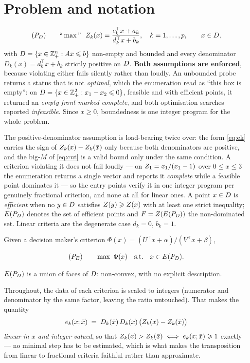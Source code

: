 \documentclass[11pt,a4paper]{article}
\begin{document}
\section{Problem and notation}

\begin{equation}
(P_{D}) \qquad
\text{``}\max\text{''} \ \ Z_k(x) = \frac{c_k^{\top}x + a_k}{d_k^{\top}x + b_k},
\quad k = 1,\dots,p, \qquad x \in D ,
\end{equation}
with $D = \{x \in \mathbb{Z}^{n}_{+} : Ax \leqslant b\}$ non-empty and bounded
and every denominator $D_k(x) = d_k^{\top}x + b_k$ strictly positive on
$D$.  \textbf{Both assumptions are enforced}, because violating either
fails silently rather than loudly.  An unbounded probe returns a status that
is not \emph{optimal}, which the enumeration read as ``this box is empty'':
on $D = \{x \in \mathbb{Z}^{2}_{+} : x_1 - x_2 \leqslant 0\}$, feasible and with
efficient points, it returned an \emph{empty front marked complete}, and both
optimisation searches reported \emph{infeasible}.  Since $x \geqslant 0$,
boundedness is one integer program for the whole problem.

The positive-denominator assumption is load-bearing twice over: the form \eqref{eq:ek} carries the sign of
$Z_k(x) - Z_k(\bar x)$ only because both denominators are positive, and the
big-$M$ of \eqref{eq:cut} is a valid bound only under the same condition.  A
criterion violating it does not fail loudly --- on $Z_1 = x_1/(x_1-1)$ over
$0 \leqslant x \leqslant 3$ the enumeration returns a single vector and reports
it \emph{complete} while a feasible point dominates it --- so the entry points
verify it in one integer program per genuinely fractional criterion, and none
at all for linear ones.  A point $x \in D$ is \emph{efficient} when no $y \in D$
satisfies $Z(y) \geqslant Z(x)$ with at least one strict inequality; $E(P_{D})$
denotes the set of efficient points and $F = Z(E(P_{D}))$ the non-dominated set.
Linear criteria are the degenerate case $d_k = 0$, $b_k = 1$.

Given a decision maker's criterion
$\Phi(x) = (U^{\top}x + \alpha)/(V^{\top}x + \beta)$,

\begin{equation}
(P_E) \qquad \max \ \Phi(x) \quad \text{s.t.} \quad x \in E(P_{D}) .
\end{equation}

\noindent
$E(P_{D})$ is a union of faces of $D$: non-convex, with no explicit description.

Throughout, the data of each criterion is scaled to integers (numerator and
denominator by the same factor, leaving the ratio untouched).  That makes the
quantity
\begin{equation}\label{eq:ek}
  e_k(x ; \bar x) \;=\; D_k(\bar x)\,D_k(x)\,\bigl(Z_k(x) - Z_k(\bar x)\bigr)
\end{equation}
\emph{linear in $x$ and integer-valued}, so that
$Z_k(x) > Z_k(\bar x) \iff e_k(x;\bar x) \geqslant 1$ exactly --- no minimal
step has to be estimated, which is what makes the transposition from linear to
fractional criteria faithful rather than approximate.
\end{document}
